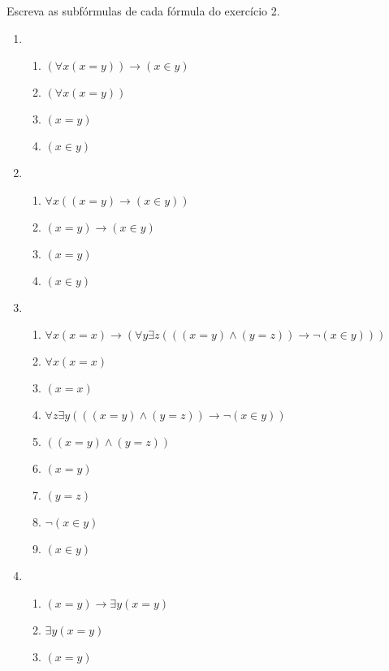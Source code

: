 \begin{exercicio}
	Escreva as subfórmulas de cada fórmula do exercício 2.
\end{exercicio}

\begin{solucao}

\begin{enumerate}
	\item 
	\begin{enumerate}
		\item $(\forall x (x = y)) \rightarrow (x \in y)$
		\item $(\forall x (x = y))$
		\item $(x = y)$
		\item $(x \in y)$
	\end{enumerate}
	
	\item 
	\begin{enumerate}
		\item $\forall x ((x = y) \rightarrow (x \in y))$
		\item $(x = y) \rightarrow (x \in y)$
		\item $(x = y)$
		\item $(x \in y)$
	\end{enumerate}
	
	\item 
	\begin{enumerate}
		\item $\forall x (x = x) \rightarrow (\forall y \exists z (((x = y) \land (y = z)) \rightarrow \neg (x \in y)))$
		\item $\forall x (x = x)$
		\item $(x = x)$
		\item $\forall z \exists y (((x = y) \land (y = z)) \rightarrow \neg (x \in y))$
		\item $((x = y) \land (y = z))$
		\item $(x = y)$
		\item $(y = z)$
		\item $\neg (x \in y)$
		\item $(x \in y)$
	\end{enumerate}
	
	\item 
	\begin{enumerate}
		\item $(x = y) \rightarrow \exists y (x = y)$
		\item $\exists y (x = y)$
		\item $(x = y)$
	\end{enumerate}
\end{enumerate}

\end{solucao}